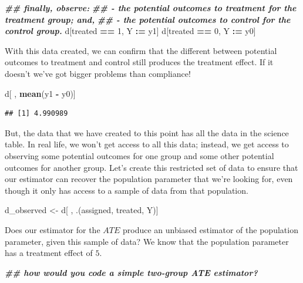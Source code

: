 \documentclass[
]{article}
\newenvironment{Shaded}{\begin{snugshade}}{\end{snugshade}}
\newcommand{\DecValTok}[1]{\textcolor[rgb]{0.00,0.00,0.81}{#1}}
\newcommand{\DocumentationTok}[1]{\textcolor[rgb]{0.56,0.35,0.01}{\textbf{\textit{#1}}}}
\newcommand{\FunctionTok}[1]{\textcolor[rgb]{0.13,0.29,0.53}{\textbf{#1}}}
\newcommand{\NormalTok}[1]{#1}
\newcommand{\OtherTok}[1]{\textcolor[rgb]{0.56,0.35,0.01}{#1}}
\newcommand{\SpecialCharTok}[1]{\textcolor[rgb]{0.81,0.36,0.00}{\textbf{#1}}}
\theoremstyle{definition}
\theoremstyle{definition}
\theoremstyle{definition}
\theoremstyle{definition}
\theoremstyle{remark}
\begin{document}
\begin{Shaded}
\begin{Highlighting}[]
\DocumentationTok{\#\# finally, observe: }
\DocumentationTok{\#\#   {-} the potential outcomes to treatment for the treatment group; and, }
\DocumentationTok{\#\#   {-} the potential outcomes to control for the control group. }
\NormalTok{d[treated }\SpecialCharTok{==} \DecValTok{1}\NormalTok{, Y }\SpecialCharTok{:=}\NormalTok{ y1]}
\NormalTok{d[treated }\SpecialCharTok{==} \DecValTok{0}\NormalTok{, Y }\SpecialCharTok{:=}\NormalTok{ y0]}
\end{Highlighting}
\end{Shaded}

With this data created, we can confirm that the different between potential outcomes to treatment and control still produces the treatment effect. If it doesn't we've got bigger problems than compliance!

\begin{Shaded}
\begin{Highlighting}[]
\NormalTok{d[ , }\FunctionTok{mean}\NormalTok{(y1 }\SpecialCharTok{{-}}\NormalTok{ y0)]}
\end{Highlighting}
\end{Shaded}

\begin{verbatim}
## [1] 4.990989
\end{verbatim}

But, the data that we have created to this point has all the data in the science table. In real life, we won't get access to all this data; instead, we get access to observing some potential outcomes for one group and some other potential outcomes for another group. Let's create this restricted set of data to ensure that our estimator can recover the population parameter that we're looking for, even though it only has access to a sample of data from that population.

\begin{Shaded}
\begin{Highlighting}[]
\NormalTok{d\_observed }\OtherTok{\textless{}{-}}\NormalTok{ d[ , .(assigned, treated, Y)]}
\end{Highlighting}
\end{Shaded}

Does our estimator for the \(ATE\) produce an unbiased estimator of the population parameter, given this sample of data? We know that the population parameter has a treatment effect of \(5\).

\begin{Shaded}
\begin{Highlighting}[]
\DocumentationTok{\#\# how would you code a simple two{-}group ATE estimator? }
\end{Highlighting}
\end{Shaded}
\end{document}

